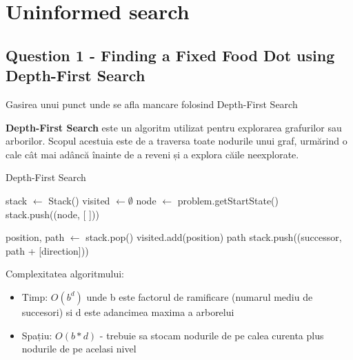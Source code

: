 \section{Uninformed search}
\subsection{Question 1 - Finding a Fixed Food Dot using Depth-First Search}
\par Gasirea unui punct unde se afla mancare folosind Depth-First Search
\par \textbf{Depth-First Search} este un algoritm utilizat pentru explorarea grafurilor sau arborilor. Scopul acestuia este de a traversa toate nodurile unui graf, urmărind o cale cât mai adâncă înainte de a reveni și a explora căile neexplorate.

\begin{algorithm}
\caption{Depth-First Search}
\begin{algorithmic}[1]
    \State stack $\gets$ Stack()
    \State visited $\gets \emptyset$
    \State node $\gets$ problem.getStartState()
    \State stack.push((node, [ ]))
    
        \State position, path $\gets$ stack.pop()
            \State visited.add(position)
                \Return path
            \EndIf
                    \State stack.push((successor, path + [direction]))
                \EndIf
            \EndFor
        \EndIf
    \EndWhile \\
    \Return [ ]
\EndFunction
\end{algorithmic}
\end{algorithm}

\par Complexitatea algoritmului:

\begin{itemize}
    \item Timp: $O(b^d)$ unde b este factorul de ramificare (numarul mediu de succesori) si d este adancimea maxima a arborelui
    \item Spațiu: $O(b*d)$ - trebuie sa stocam nodurile de pe calea curenta plus nodurile de pe acelasi nivel 
\end{itemize}

